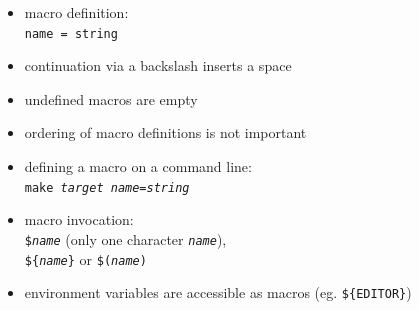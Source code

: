 \begin{slide}
\begin{itemize}
\item macro definition:\\
\hspace*{5em}\texttt{name = string}
\item continuation via a backslash inserts a space
\item undefined macros are empty
\item ordering of macro definitions is not important
\item defining a macro on a command line: \\
\hspace*{5em}\texttt{make \emph{target} \emph{name}=\emph{string}}
\item macro invocation: \\
\hspace*{5em}\texttt{\$\emph{name}} (only one character
\texttt{\emph{name}}), \\
\hspace*{5em}\texttt{\$\{\emph{name}\}} or \texttt{\$(\emph{name})}
\item environment variables are accessible as macros (eg. \texttt{\$\{EDITOR\}})
\end{itemize}
\end{slide}

